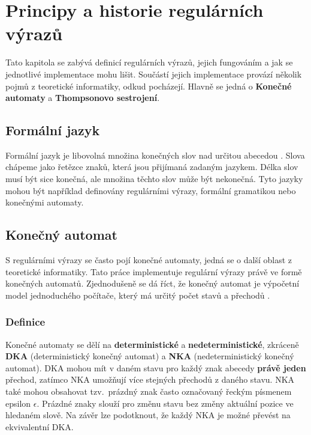 \chapter{Principy a historie regulárních výrazů}\label{sec:Principle}

Tato kapitola se zabývá definicí regulárních výrazů, jejich fungováním a jak se jednotlivé implementace mohu lišit. 
Součástí jejich implementace provází několik pojmů z teoretické informatiky, odkud pocházejí.
Hlavně se jedná o \textbf{Konečné automaty} a \textbf{Thompsonovo sestrojení}.

\section{Formální jazyk}
Formální jazyk je libovolná množina konečných slov nad určitou abecedou \cite{MUNIFL}. 
Slova chápeme jako řetězce znaků, která jsou přijímaná zadaným jazykem.
Délka slov musí být sice konečná, ale množina těchto slov může být nekonečná. 
Tyto jazyky mohou být například definovány regulárními výrazy, formální gramatikou nebo konečnými automaty. 

\section{Konečný automat}\label{sec:FiniteAutomaton}
S regulárními výrazy se často pojí konečné automaty, jedná se o další oblast z teoretické informatiky.
Tato práce implementuje regulární výrazy právě ve formě konečných automatů.
Zjednodušeně se dá říct, že konečný automat je výpočetní model jednoduchého počítače, který má určitý počet stavů a přechodů \cite{Havrlant}. 

\subsection*{Definice}

Konečné automaty se dělí na \textbf{deterministické} a \textbf{nedeterministické}, zkráceně \textbf{DKA} (deterministický konečný automat) a \textbf{NKA} (nedeterministický konečný automat).
DKA mohou mít v daném stavu pro každý znak abecedy \textbf{právě jeden} přechod, zatímco NKA umožňují více stejných přechodů z daného stavu. 
NKA také mohou obsahovat tzv.\ prázdný znak často označovaný řeckým písmenem epsilon $\epsilon$. 
Prázdné znaky slouží pro změnu stavu bez změny aktuální pozice ve hledaném slově. 
Na závěr lze podotknout, že každý NKA je možné převést na ekvivalentní DKA.


